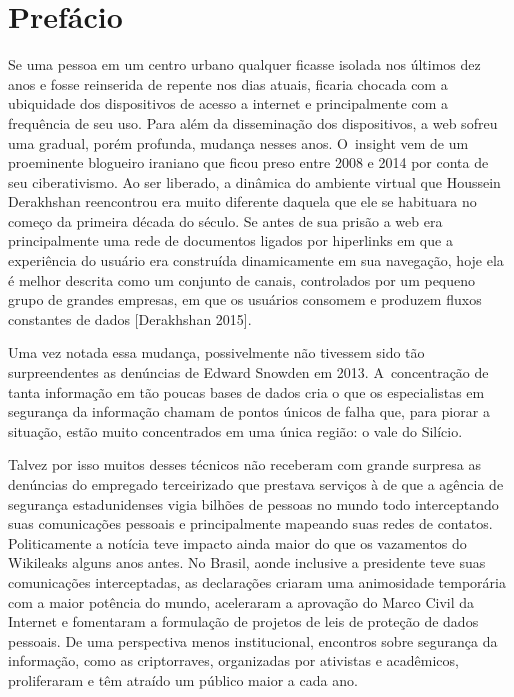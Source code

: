 

\chapter{Prefácio}\label{prefuxe1cio}

Se uma pessoa em um centro urbano qualquer ficasse isolada nos últimos
dez anos e fosse reinserida de repente nos dias atuais, ficaria chocada
com a ubiquidade dos dispositivos de acesso a internet e principalmente
com a frequência de seu uso. Para além da disseminação dos dispositivos,
a web sofreu uma gradual, porém profunda, mudança nesses anos. O~insight
vem de um proeminente blogueiro iraniano que ficou preso entre 2008 e
2014 por conta de seu ciberativismo. Ao ser liberado, a dinâmica do
ambiente virtual que Houssein Derakhshan reencontrou era muito diferente
daquela que ele se habituara no começo da primeira década do século. Se
antes de sua prisão a web era principalmente uma rede de documentos
ligados por hiperlinks em que a experiência do usuário era construída
dinamicamente em sua navegação, hoje ela é melhor descrita como um
conjunto de canais, controlados por um pequeno grupo de grandes
empresas, em que os usuários consomem e produzem fluxos constantes de
dados {[}Derakhshan 2015{]}.

Uma vez notada essa mudança, possivelmente não tivessem sido tão
surpreendentes as denúncias de Edward Snowden em 2013. A~concentração de
tanta informação em tão poucas bases de dados cria o que os
especialistas em segurança da informação chamam de pontos únicos de
falha que, para piorar a situação, estão muito concentrados em uma única
região: o vale do Silício.

Talvez por isso muitos desses técnicos não receberam com grande surpresa
as denúncias do empregado terceirizado que prestava serviços à  de
que a agência de segurança estadunidenses vigia bilhões de pessoas no
mundo todo interceptando suas comunicações pessoais e principalmente
mapeando suas redes de contatos. Politicamente a notícia teve impacto
ainda maior do que os vazamentos do Wikileaks alguns anos antes. No
Brasil, aonde inclusive a presidente teve suas comunicações
interceptadas, as declarações criaram uma animosidade temporária com a
maior potência do mundo, aceleraram a aprovação do Marco Civil da
Internet e fomentaram a formulação de projetos de leis de proteção de
dados pessoais. De uma perspectiva menos institucional, encontros sobre
segurança da informação, como as criptorraves, organizadas por ativistas
e acadêmicos, proliferaram e têm atraído um público maior a cada ano.

